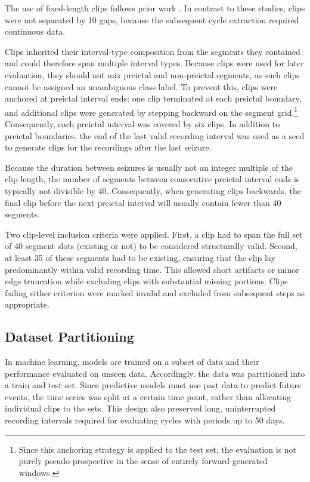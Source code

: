 The use of fixed-length clips follows prior work \parencite{brinkmann_crowdsourcing_2016, kuhlmann_epilepsyecosystemorg_2018, muller_coherent_2022}.
In contrast to these studies, clips were not separated by \SI{10}{\sec} gaps, because the subsequent cycle extraction required continuous data.

Clips inherited their interval-type composition from the segments they contained and could therefore span multiple interval types.
Because clips were used for later evaluation, they should not mix preictal and non-preictal segments, as such clips cannot be assigned an unambiguous class label.
To prevent this, clips were anchored at preictal interval ends: one clip terminated at each preictal boundary, and additional clips were generated by stepping backward on the segment grid.\footnote{Since this anchoring strategy is applied to the test set, the evaluation is not purely pseudo-prospective in the sense of entirely forward-generated windows.}
Consequently, each preictal interval was covered by six clips.
In addition to preictal boundaries, the end of the last valid recording interval was used as a seed to generate clips for the recordings after the last seizure.

Because the duration between seizures is usually not an integer multiple of the clip length, the number of segments between consecutive preictal interval ends is typically not divisible by 40.
Consequently, when generating clips backwards, the final clip before the next preictal interval will usually contain fewer than 40 segments.

Two clip-level inclusion criteria were applied.
First, a clip had to span the full set of 40 segment slots (existing or not) to be considered structurally valid.
Second, at least 35 of these segments had to be existing, ensuring that the clip lay predominantly within valid recording time.
This allowed short artifacts or minor edge truncation while excluding clips with substantial missing portions.
Clips failing either criterion were marked invalid and excluded from subsequent steps as appropriate.


\subsection{Dataset Partitioning} \label{subsec:dataset-partitioning}
In machine learning, models are trained on a subset of data and their performance evaluated on unseen data.
Accordingly, the data was partitioned into a train and test set.
Since predictive models must use past data to predict future events, the time series was split at a certain time point, rather than allocating individual clips to the sets.
This design also preserved long, uninterrupted recording intervals required for evaluating cycles with periods up to 50 days.

